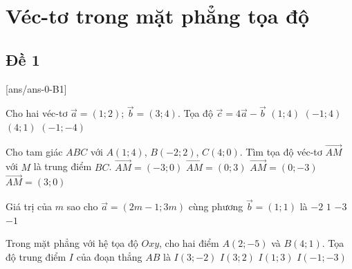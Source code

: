 \section{Véc-tơ trong mặt phẳng tọa độ}

\subsection{Đề 1}
[ans/ans-0-B1]
\caulc
\begin{ex}%
	Cho hai véc-tơ $\overrightarrow{a}=(1;2)$; $\overrightarrow{b}=(3;4)$. Tọa độ $\overrightarrow{c}=4\overrightarrow{a}-\overrightarrow{b}$
	\choice
	{\True $(1;4)$}
	{$(-1;4)$}
	{$(4;1)$}
	{$(-1;-4)$}
\end{ex}

\begin{ex}%
	Cho tam giác $ABC$ với $A(1;4)$, $B(-2;2)$, $C(4;0)$. Tìm tọa độ véc-tơ $\overrightarrow{AM}$ với $M$ là trung điểm $BC$.
	\choice
	{$\overrightarrow{AM}=(-3;0)$}
	{$\overrightarrow{AM}=(0;3)$}
	{\True $\overrightarrow{AM}=(0;-3)$}
	{$\overrightarrow{AM}=(3;0)$}
\end{ex}

\begin{ex}%
	Giá trị của $m$ sao cho $\overrightarrow{a}=(2m-1;3m)$ cùng phương $\overrightarrow{b}=(1;1)$ là
	\choice
	{$-2$}
	{$1$}
	{$-3$}
	{\True $-1$}
\end{ex}

\begin{ex}%
	Trong mặt phẳng với hệ tọa độ $Oxy$, cho hai điểm $A(2;-5)$ và $B(4;1)$. Tọa độ trung điểm $I$ của đoạn thẳng $AB$ là
	\choice
	{\True $I(3;-2)$}
	{$I(3;2)$}
	{$I(1;3)$}
	{$I(-1;-3)$}
\end{ex}

